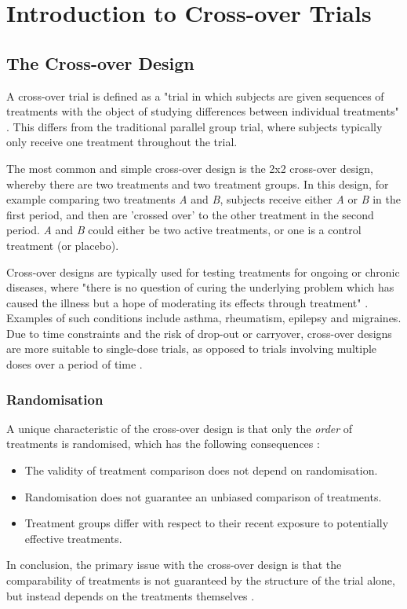 \documentclass[12pt, TexShade, letterpaper]{report}
\begin{document}
\chapter{Introduction to Cross-over Trials}
\section{The Cross-over Design}
A cross-over trial is defined as a "trial in which subjects are given sequences of treatments with the object of studying differences between individual treatments" \cite{senn2002crossover}. This differs from the traditional parallel group trial, where subjects typically only receive one treatment throughout the trial.

The most common and simple cross-over design is the 2x2 cross-over design, whereby there are two treatments and two treatment groups. In this design, for example comparing two treatments \textit{A} and \textit{B}, subjects receive either \textit{A} or \textit{B} in the first period, and then are 'crossed over' to the other treatment in the second period. \textit{A} and \textit{B} could either be two active treatments, or one is a control treatment (or placebo).

Cross-over designs are typically used for testing treatments for ongoing or chronic diseases, where "there is no question of curing the underlying problem which has caused the illness but a hope of moderating its effects through treatment" \cite{senn2002crossover}. Examples of such conditions include asthma, rheumatism, epilepsy and migraines. Due to time constraints and the risk of drop-out or carryover, cross-over designs are more suitable to single-dose trials, as opposed to trials involving multiple doses over a period of time \cite{senn2002crossover}.

\subsection{Randomisation}
A unique characteristic of the cross-over design is that only the \textit{order} of treatments is randomised, which has the following consequences \cite{piantadosi2005clinical}:
\begin{itemize}
    \item The validity of treatment comparison does not depend on randomisation.
    \item Randomisation does not guarantee an unbiased comparison of treatments.
    \item Treatment groups differ with respect to their recent exposure to potentially effective treatments.
\end{itemize}
In conclusion, the primary issue with the cross-over design is that the comparability of treatments is not guaranteed by the structure of the trial alone, but instead depends on the treatments themselves \cite{piantadosi2005clinical}.
\end{document}
